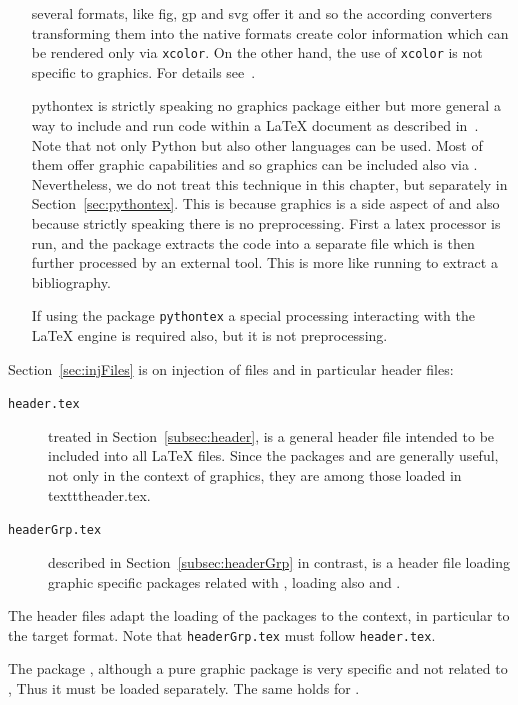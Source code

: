 \begin{itemize}
several formats, like \gls{fig}, \gls{gp} and \gls{svg} 
offer it and so the according converters 
transforming them into the native formats 
create color information which can be rendered only via \texttt{xcolor}. 
On the other hand, the use of \texttt{xcolor} is not specific to graphics. 
For details see~\cite{XColorP}. 
\item[pythontex]
is strictly speaking no graphics package either but more general 
a way to include and run code within a \LaTeX{} document 
as described in~\cite{PythonTexP}. 
Note that not only Python but also other languages can be used. 
Most of them offer graphic capabilities 
and so graphics can be included also via . 
Nevertheless, we do not treat this technique in this chapter, 
but separately in Section~\ref{sec:pythontex}. 
This is because graphics is a side aspect of  
and also because strictly speaking there is no preprocessing. 
First a latex processor is run, and the package extracts the code 
into a separate file which is then further processed by an external tool. 
This is more like running  to extract a bibliography. 

If using the package \texttt{pythontex} 
a special processing interacting with the \LaTeX{} engine is required also, 
but it is not preprocessing. 
\end{itemize}

Section~\ref{sec:injFiles} is on injection of files 
and in particular header files: 
%
\begin{description}
  \item[\texttt{header.tex}] treated in Section~\ref{subsec:header}, 
  is a general header file intended to be included into all \LaTeX{} files. 
  Since the packages  and  are generally useful, 
  not only in the context of graphics, they are among those loaded in texttt{header.tex}. 
  \item[\texttt{headerGrp.tex}] described in Section~\ref{subsec:headerGrp} in contrast, 
  is a header file loading graphic specific packages related with , 
  loading also  and . 
\end{description}

The header files adapt the loading of the packages to the context, 
in particular to the target format. 
Note that \texttt{headerGrp.tex} must follow \texttt{header.tex}. 

The package , although a pure graphic package 
is very specific and not related to , 
Thus it must be loaded separately. The same holds for . 

